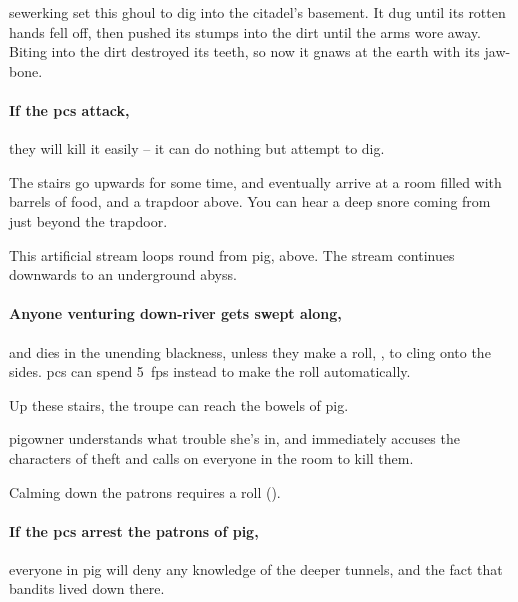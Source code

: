 \begin{exampletext}
  \Gls{sewerking} set this ghoul to dig into the citadel's basement.
  It dug until its rotten hands fell off, then pushed its stumps into the dirt until the arms wore away.
  Biting into the dirt destroyed its teeth, so now it gnaws at the earth with its jaw-bone.
\end{exampletext}

\paragraph{If the \glspl{pc} attack,}
they will kill it easily -- it can do nothing but attempt to dig.

\begin{boxtext}

  The stairs go upwards for some time, and eventually arrive at a room filled with barrels of food, and a trapdoor above.
  You can hear a deep snore coming from just beyond the trapdoor.

\end{boxtext}

This artificial stream loops round from \gls{pig}, above.
The stream continues downwards to an underground abyss.

\paragraph{Anyone venturing down-river gets swept along,}
and dies in the unending blackness, unless they make a  roll, \tn[10], to cling onto the sides.
\Glspl{pc} can spend 5~\glspl{fp} instead to make the roll automatically.


Up these stairs, the troupe can reach the bowels of \gls{pig}.

\Gls{pigowner} understands what trouble she's in, and immediately accuses the characters of theft and calls on everyone in the room to kill them.

Calming down the patrons requires a  roll (\tn[10]).

\paragraph{If the \glspl{pc} arrest the patrons of \gls{pig},}
everyone in \gls{pig} will deny any knowledge of the deeper tunnels, and the fact that bandits lived down there.


